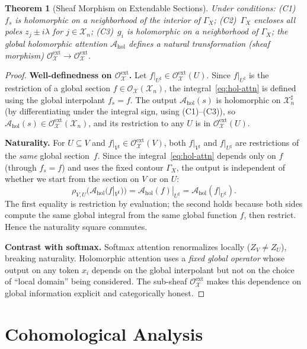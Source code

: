 \documentclass[11pt,a4paper]{article}
\theoremstyle{plain}
\newtheorem{theorem}{Theorem}[section]
\theoremstyle{definition}
\theoremstyle{remark}
\newcommand{\cO}{\mathcal{O}}
\newcommand{\cX}{\mathcal{X}}
\newcommand{\cA}{\mathcal{A}}
\begin{document}
\begin{theorem}[Sheaf Morphism on Extendable Sections]\label{thm:hol-morphism}
Under conditions: (C1)~$f_s$ is holomorphic on a neighborhood of the interior of $\Gamma_X$; (C2)~$\Gamma_X$ encloses all poles $z_j \pm i\lambda$ for $j \in \cX_n$; (C3)~$g_i$ is holomorphic on a neighborhood of $\Gamma_X$; the global holomorphic attention $\cA_{\mathrm{hol}}$ defines a natural transformation (sheaf morphism) $\cO_\cX^{\mathrm{ext}} \to \cO_\cX^{\mathrm{ext}}$.
\end{theorem}

\begin{proof}
\textbf{Well-definedness on $\cO_\cX^{\mathrm{ext}}$.} Let $f|_{U^\sharp} \in \cO_\cX^{\mathrm{ext}}(U)$. Since $f|_{U^\sharp}$ is the restriction of a global section $f \in \cO_\cX(\cX_n)$, the integral~\eqref{eq:hol-attn} is defined using the global interpolant $f_s = f$. The output $\cA_{\mathrm{hol}}(s)$ is holomorphic on $\cX_n^\sharp$ (by differentiating under the integral sign, using (C1)--(C3)), so $\cA_{\mathrm{hol}}(s) \in \cO_\cX^{\mathrm{ext}}(\cX_n)$, and its restriction to any $U$ is in $\cO_\cX^{\mathrm{ext}}(U)$.

\textbf{Naturality.} For $U \subseteq V$ and $f|_{V^\sharp} \in \cO_\cX^{\mathrm{ext}}(V)$, both $f|_{V^\sharp}$ and $f|_{U^\sharp}$ are restrictions of the \emph{same} global section~$f$. Since the integral~\eqref{eq:hol-attn} depends only on $f$ (through $f_s = f$) and uses the fixed contour $\Gamma_X$, the output is independent of whether we start from the section on $V$ or on $U$:
\[
\rho_{V,U}\bigl(\cA_{\mathrm{hol}}(f|_{V^\sharp})\bigr) = \cA_{\mathrm{hol}}(f)|_{U^\sharp} = \cA_{\mathrm{hol}}(f|_{U^\sharp}).
\]
The first equality is restriction by evaluation; the second holds because both sides compute the same global integral from the same global function $f$, then restrict. Hence the naturality square commutes.

\textbf{Contrast with softmax.} Softmax attention renormalizes locally ($Z_V \neq Z_U$), breaking naturality. Holomorphic attention uses a \emph{fixed global operator} whose output on any token $x_i$ depends on the global interpolant but not on the choice of ``local domain'' being considered. The sub-sheaf $\cO_\cX^{\mathrm{ext}}$ makes this dependence on global information explicit and categorically honest.
\end{proof}

\section{Cohomological Analysis}\label{sec:cohomology}
\end{document}
